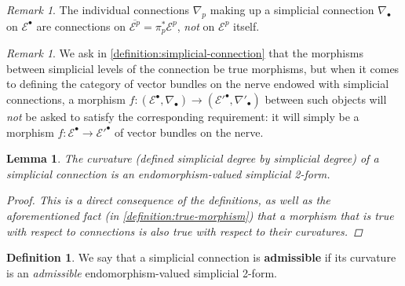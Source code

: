 \documentclass[11pt,fleqn]{article}
\theoremstyle{plain}
\newtheorem{lemma}[theorem]{Lemma}
\theoremstyle{definition}
\newtheorem{definition}[theorem]{Definition}
\theoremstyle{remark}
\newtheorem{remark}[theorem]{Remark}
\numberwithin{equation}{theorem}
\newcommand{\define}[1]{\textbf{#1}}
\begin{document}
        \begin{remark}
            The individual connections $\nabla_p$ making up a simplicial connection $\nabla_\bullet$ on $\mathcal{E}^\bullet$ are connections on $\overline{\mathcal{E}^p}=\pi_p^*\mathcal{E}^p$, \emph{not} on $\mathcal{E}^p$ itself.
        \end{remark}

        \begin{remark}
            We ask in \cref{definition:simplicial-connection} that the morphisms between simplicial levels of the connection be true morphisms, but when it comes to defining the category of vector bundles on the nerve endowed with simplicial connections, a morphism $f\colon(\mathcal{E}^\bullet,\nabla_\bullet)\to(\mathcal{E}'^{\bullet},\nabla'_\bullet)$ between such objects will \emph{not} be asked to satisfy the corresponding requirement: it will simply be a morphism $f\colon\mathcal{E}^\bullet\to\mathcal{E}'^\bullet$ of vector bundles on the nerve.
        \end{remark}

        \begin{lemma}
            The curvature (defined simplicial degree by simplicial degree) of a simplicial connection is an endomorphism-valued simplicial 2-form.

            \begin{proof}
                This is a direct consequence of the definitions, as well as the aforementioned fact (in \cref{definition:true-morphism}) that a morphism that is true with respect to connections is also true with respect to their curvatures.
            \end{proof}
        \end{lemma}

        \begin{definition}\label{definition:admissible-simplicial-connection}
            We say that a simplicial connection is \define{admissible} if its curvature is an \emph{admissible} endomorphism-valued simplicial 2-form.
        \end{definition}
\end{document}
